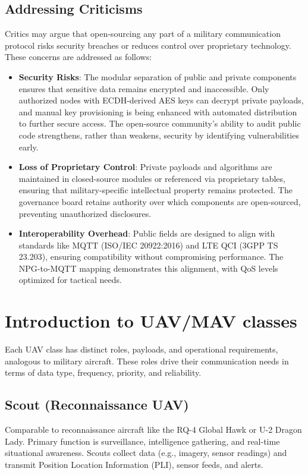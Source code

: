 \documentclass{article}
\begin{document}
\subsection{Addressing Criticisms}
Critics may argue that open-sourcing any part of a military communication
protocol risks security breaches or reduces control over proprietary technology.
These concerns are addressed as follows:
\begin{itemize}
    \item \textbf{Security Risks}:
    The modular separation of public and private components ensures
    that sensitive data remains encrypted and inaccessible.
    Only authorized nodes with ECDH-derived AES keys can decrypt private payloads,
    and manual key provisioning is being enhanced with automated distribution
    to further secure access. The open-source community's ability to audit
    public code strengthens, rather than weakens, security
    by identifying vulnerabilities early.
    \item \textbf{Loss of Proprietary Control}:
    Private payloads and algorithms are maintained in closed-source
    modules or referenced via proprietary tables, ensuring that military-specific
    intellectual property remains protected. The governance board retains
    authority over which components are open-sourced, preventing unauthorized disclosures.
    \item \textbf{Interoperability Overhead}: Public fields are designed
    to align with standards like MQTT (ISO/IEC 20922:2016) and LTE QCI (3GPP TS 23.203),
    ensuring compatibility without compromising performance. The NPG-to-MQTT
    mapping demonstrates this alignment, with QoS levels optimized for tactical needs.
\end{itemize}

\newpage
\section{Introduction to UAV/MAV classes}
Each UAV class has distinct roles, payloads, and operational requirements,
analogous to military aircraft. These roles drive their communication needs
in terms of data type, frequency, priority, and reliability.

\subsection{Scout (Reconnaissance UAV)}
Comparable to reconnaissance aircraft like the RQ-4 Global Hawk or U-2 Dragon Lady.
Primary function is surveillance, intelligence gathering, and real-time situational awareness.
Scouts collect data (e.g., imagery, sensor readings) and transmit Position Location
Information (PLI), sensor feeds, and alerts.
\end{document}
